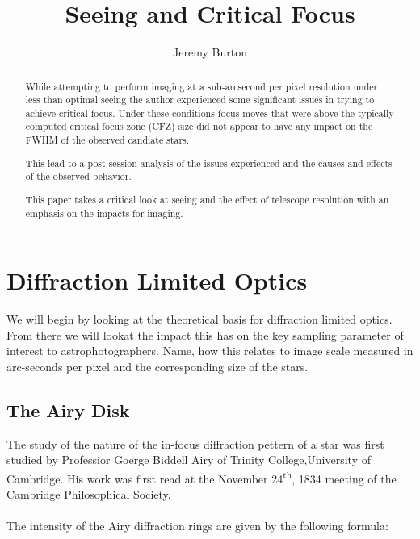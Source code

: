 \documentclass[11pt]{article}
\begin{document}
\title{Seeing and Critical Focus}
\author{Jeremy Burton}


\maketitle
\newpage

\begin{abstract}
\setlength{\parindent}{0em}
\setlength{\parskip}{1em}

While attempting to perform imaging at a sub-arcsecond per pixel resolution under less than optimal seeing the author experienced some significant issues in trying to achieve critical focus.  Under these conditions focus moves that were above the typically computed critical focus zone (CFZ) size did not appear to have any impact on the FWHM of the observed candiate stars.

This lead to a post session analysis of the issues experienced and the causes and effects of the observed behavior.  

This paper takes a critical look at seeing and the effect of telescope resolution with an emphasis on the impacts for imaging.

\end{abstract}
\newpage

\section{Diffraction Limited Optics}

We will begin by looking at the theoretical basis for diffraction limited optics.  From there we will lookat the impact this has on the key sampling parameter of interest to astrophotographers.  Name, how this relates to image scale measured in arc-seconds per pixel and the corresponding size of the stars.

\subsection{The Airy Disk}

The study of the nature of the in-focus diffraction pettern of a star was first studied by Professior Goerge Biddell Airy of Trinity College,University of Cambridge.   His work was first read at the November 24\textsuperscript{th}, 1834 meeting of the Cambridge Philosophical Society.
\paragraph{}
The intensity of the Airy diffraction rings are given by the following formula:
\end{document}
